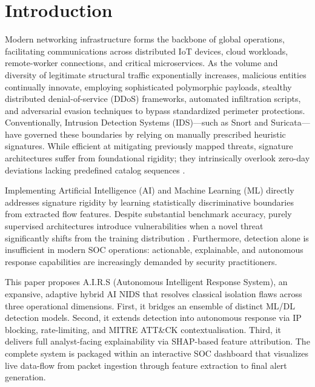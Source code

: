 \documentclass[conference]{IEEEtran}
\begin{document}
\section{Introduction}
Modern networking infrastructure forms the backbone of global operations, facilitating communications across distributed IoT devices, cloud workloads, remote-worker connections, and critical microservices. As the volume and diversity of legitimate structural traffic exponentially increases, malicious entities continually innovate, employing sophisticated polymorphic payloads, stealthy distributed denial-of-service (DDoS) frameworks, automated infiltration scripts, and adversarial evasion techniques to bypass standardized perimeter protections. Conventionally, Intrusion Detection Systems (IDS)—such as Snort and Suricata—have governed these boundaries by relying on manually prescribed heuristic signatures. While efficient at mitigating previously mapped threats, signature architectures suffer from foundational rigidity; they intrinsically overlook zero-day deviations lacking predefined catalog sequences \cite{khraisat2019survey, buczak2016}.

Implementing Artificial Intelligence (AI) and Machine Learning (ML) directly addresses signature rigidity by learning statistically discriminative boundaries from extracted flow features. Despite substantial benchmark accuracy, purely supervised architectures introduce vulnerabilities when a novel threat significantly shifts from the training distribution \cite{ahmad2021survey}. Furthermore, detection alone is insufficient in modern SOC operations: actionable, explainable, and autonomous response capabilities are increasingly demanded by security practitioners.

This paper proposes A.I.R.S (Autonomous Intelligent Response System), an expansive, adaptive hybrid AI NIDS that resolves classical isolation flaws across three operational dimensions. First, it bridges an ensemble of distinct ML/DL detection models. Second, it extends detection into autonomous response via IP blocking, rate-limiting, and MITRE ATT\&CK contextualisation. Third, it delivers full analyst-facing explainability via SHAP-based feature attribution. The complete system is packaged within an interactive SOC dashboard that visualizes live data-flow from packet ingestion through feature extraction to final alert generation.
\end{document}
